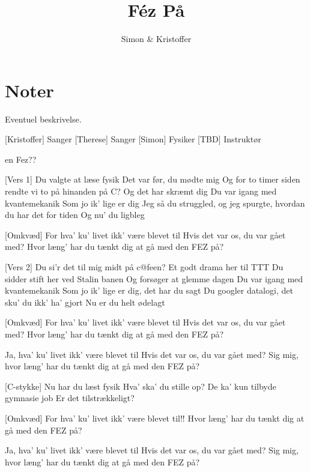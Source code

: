 \documentclass{article}
\title{Féz På}                   %
\author{Simon \& Kristoffer}  %
\begin{document}
                
\maketitle
\section*{Noter}                %
Eventuel beskrivelse.

\begin{roles}
[Kristoffer] Sanger
[Therese] Sanger
[Simon] Fysiker
[TBD] Instruktør
\end{roles}

\begin{props}
     en Fez??
\end{props}

\newpage%
\begin{song}




[Vers 1]
%
Du valgte at læse fysik
Det var før, du mødte mig
Og for to timer siden rendte vi to på hinanden på C?
Og det har skræmt dig
Du var igang med kvantemekanik
Som jo ik’ lige er dig
Jeg så du struggled, og jeg spurgte, hvordan du har det for tiden
Og nu' du ligbleg

[Omkvæd]
%
For hva' ku' livet ikk' være blevet til
Hvis det var os, du var gået med?
Hvor læng' har du tænkt dig at gå med den FEZ på?

[Vers 2]
%
Du si'r det til mig midt på c@feen?
Et godt drama her til TTT
Du sidder stift her ved Stalin banen
Og forsøger at glemme dagen
Du var igang med kvantemekanik
Som jo ik’ lige er dig, det har du sagt
Du googler datalogi, det sku' du ikk' ha' gjort
Nu er du helt ødelagt

[Omkvæd]
%
For hva' ku' livet ikk' være blevet til
Hvis det var os, du var gået med?
Hvor læng' har du tænkt dig at gå med den FEZ på?
 
%
Ja, hva' ku' livet ikk' være blevet til
Hvis det var os, du var gået med?
Sig mig, hvor læng' har du tænkt dig at gå med den FEZ på?

[C-stykke]
%
Nu har du læst fysik
%
Hva' ska' du stille op?
De ka' kun tilbyde gymnasie job
Er det tilstrækkeligt?

[Omkvæd]
%
For hva' ku' livet ikk' være blevet til!!
%
Hvor læng' har du tænkt dig at gå med den FEZ på?

Ja, hva' ku' livet ikk' være blevet til
Hvis det var os, du var gået med?
Sig mig, hvor læng' har du tænkt dig at gå med den FEZ på?
\end{song}
\end{document}
